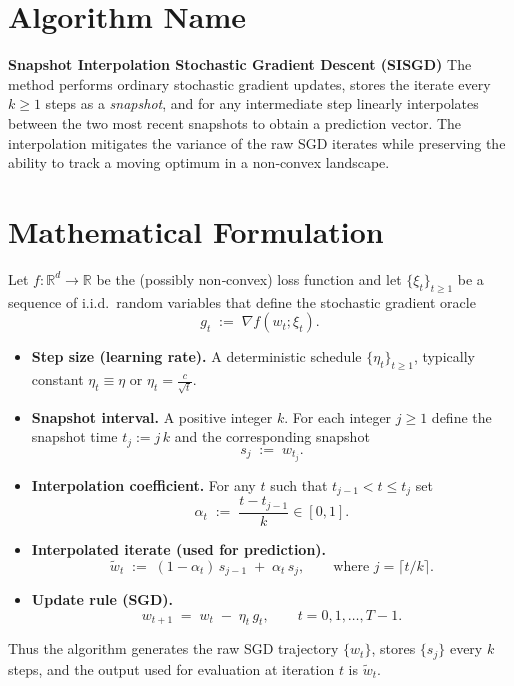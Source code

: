 \documentclass{article}
\newcommand{\R}{\mathbb{R}}
\theoremstyle{definition}
\begin{document}
\section*{Algorithm Name}
\textbf{Snapshot Interpolation Stochastic Gradient Descent (SISGD)}  
The method performs ordinary stochastic gradient updates, stores the iterate every
$k\ge 1$ steps as a \emph{snapshot}, and for any intermediate step linearly
interpolates between the two most recent snapshots to obtain a prediction
vector.  The interpolation mitigates the variance of the raw SGD iterates
while preserving the ability to track a moving optimum in a non‑convex landscape.

\section*{Mathematical Formulation}
Let $f:\R^{d}\rightarrow\R$ be the (possibly non‑convex) loss function and let
$\{\xi_t\}_{t\ge1}$ be a sequence of i.i.d.\ random variables that define the
stochastic gradient oracle
\[
g_t \;:=\; \nabla f(w_t;\xi_t).
\]

\begin{itemize}[leftmargin=*,nosep]
\item \textbf{Step size (learning rate).} A deterministic schedule
$\{\eta_t\}_{t\ge1}$, typically constant $\eta_t\equiv\eta$ or
$\eta_t=\frac{c}{\sqrt{t}}$.
\item \textbf{Snapshot interval.} A positive integer $k$.  For each integer
$j\ge1$ define the snapshot time $t_j:=j\,k$ and the corresponding snapshot
\[
s_j \;:=\; w_{t_j}.
\]
\item \textbf{Interpolation coefficient.} For any $t$ such that
$t_{j-1}<t\le t_j$ set
\[
\alpha_t \;:=\; \frac{t-t_{j-1}}{k}\in[0,1].
\]
\item \textbf{Interpolated iterate (used for prediction).}
\[
\tilde w_t \;:=\; (1-\alpha_t)\,s_{j-1} \;+\; \alpha_t\, s_{j},
\qquad\text{where }j=\big\lceil t/k\big\rceil .
\]
\item \textbf{Update rule (SGD).}
\[
w_{t+1}\;=\;w_t\;-\;\eta_t\, g_t ,\qquad t=0,1,\dots ,T-1 .
\]
\end{itemize}

Thus the algorithm generates the raw SGD trajectory $\{w_t\}$,
stores $\{s_j\}$ every $k$ steps, and the output used for evaluation at
iteration $t$ is $\tilde w_t$.

\end{document}
